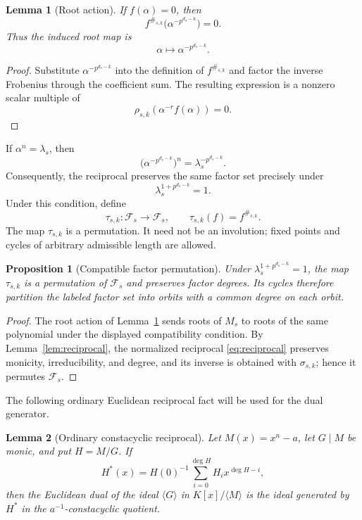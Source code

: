 \documentclass[11pt]{article}
\newcommand{\Fs}{\mathcal F_s}
\theoremstyle{plain}
\newtheorem{lemma}{Lemma}
\newtheorem{proposition}{Proposition}
\theoremstyle{definition}
\theoremstyle{remark}
\begin{document}
\begin{lemma}[Root action]\label{lem:root-action}
If $f(\alpha)=0$, then
\[
f^{\#_{s,k}}\bigl(\alpha^{-p^{d_s-k}}\bigr)=0.
\]
Thus the induced root map is
\[
\alpha\longmapsto \alpha^{-p^{d_s-k}}.
\]
\end{lemma}

\begin{proof}
Substitute $\alpha^{-p^{d_s-k}}$ into the definition of $f^{\#_{s,k}}$ and factor the inverse Frobenius through the coefficient sum. The resulting expression is a nonzero scalar multiple of
\[
\rho_{s,k}\left(\alpha^{-r}f(\alpha)\right)=0.
\]
\end{proof}

If $\alpha^n=\lambda_s$, then
\[
\bigl(\alpha^{-p^{d_s-k}}\bigr)^n=\lambda_s^{-p^{d_s-k}}.
\]
Consequently, the reciprocal preserves the same factor set precisely under
\begin{equation}\label{eq:compat}
\lambda_s^{1+p^{d_s-k}}=1.
\end{equation}
Under this condition, define
\[
\tau_{s,k}:\Fs\longrightarrow\Fs,
\qquad
\tau_{s,k}(f)=f^{\#_{s,k}}.
\]
The map $\tau_{s,k}$ is a permutation. It need not be an involution; fixed points and cycles of arbitrary admissible length are allowed.

\begin{proposition}[Compatible factor permutation]\label{prop:compatible-permutation}
Under $\lambda_s^{1+p^{d_s-k}}=1$, the map $\tau_{s,k}$ is a permutation of $\Fs$ and preserves factor degrees. Its cycles therefore partition the labeled factor set into orbits with a common degree on each orbit.
\end{proposition}

\begin{proof}
The root action of Lemma~\ref{lem:root-action} sends roots of $M_s$ to roots of the same polynomial under the displayed compatibility condition. By Lemma~\ref{lem:reciprocal}, the normalized reciprocal \eqref{eq:reciprocal} preserves monicity, irreducibility, and degree, and its inverse is obtained with $\sigma_{s,k}$; hence it permutes $\Fs$.
\end{proof}

The following ordinary Euclidean reciprocal fact will be used for the dual generator.

\begin{lemma}[Ordinary constacyclic reciprocal]\label{lem:ordinary-reciprocal}
Let $M(x)=x^n-a$, let $G\mid M$ be monic, and put $H=M/G$. If
\[
H^*(x)=H(0)^{-1}\sum_{i=0}^{\deg H}H_i x^{\deg H-i},
\]
then the Euclidean dual of the ideal $\langle G\rangle$ in $K[x]/\langle M\rangle$ is the ideal generated by $H^*$ in the $a^{-1}$-constacyclic quotient.
\end{lemma}
\end{document}
